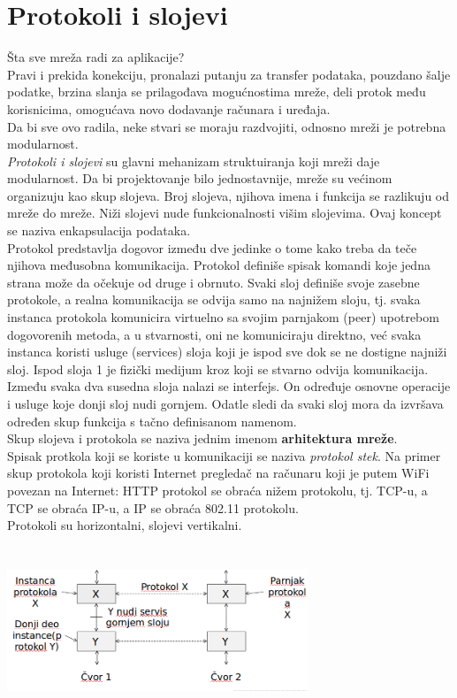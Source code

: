 \documentclass{article} %
\begin{document}
\section{Protokoli i slojevi}
Šta sve mreža radi za aplikacije? \\
Pravi i prekida konekciju, pronalazi putanju za transfer podataka, pouzdano šalje podatke, brzina slanja se prilagođava mogućnostima mreže, deli protok među korisnicima, omogućava novo dodavanje računara i uređaja. \\
Da bi sve ovo radila, neke stvari se moraju razdvojiti, odnosno mreži je potrebna modularnost. \\
 \textit{Protokoli i slojevi} su glavni mehanizam struktuiranja koji mreži daje modularnost. Da bi projektovanje bilo jednostavnije, mreže su većinom organizuju kao skup slojeva. Broj slojeva, njihova imena i funkcija se razlikuju od mreže do mreže.  Niži slojevi nude funkcionalnosti višim slojevima. Ovaj koncept se naziva enkapsulacija podataka.\\
Protokol predstavlja dogovor između dve jedinke o tome kako treba da teče njihova međusobna komunikacija. Protokol definiše spisak komandi koje jedna strana može da očekuje od druge i obrnuto. Svaki sloj definiše svoje zasebne protokole, a realna komunikacija se odvija samo na najnižem sloju, tj. svaka instanca protokola komunicira virtuelno sa svojim parnjakom (peer) upotrebom dogovorenih metoda, a u  stvarnosti, oni ne komuniciraju direktno, već svaka instanca koristi usluge (services) sloja koji je ispod sve dok se ne dostigne najniži sloj. Ispod sloja 1 je fizički medijum kroz koji se stvarno odvija komunikacija.   \\
Između svaka dva susedna sloja nalazi se interfejs. On određuje osnovne operacije i usluge koje donji sloj nudi gornjem. Odatle sledi da svaki sloj mora da izvršava određen skup funkcija s tačno definisanom namenom.\\
Skup slojeva i protokola se naziva jednim imenom \textbf{arhitektura mreže}.\\
Spisak protkola koji se koriste u komunikaciji se naziva \textit{protokol stek}. Na primer skup protokola koji koristi Internet pregledač na računaru koji je putem WiFi povezan na Internet: HTTP protokol se obraća nižem protokolu, tj. TCP-u, a TCP se obraća IP-u, a IP se obraća 802.11 protokolu. \\
Protokoli su horizontalni, slojevi vertikalni. \\
\begin{center}
\includegraphics[width=9cm, height=5cm]{protokoli}\\
\end{center}
\end{document}
